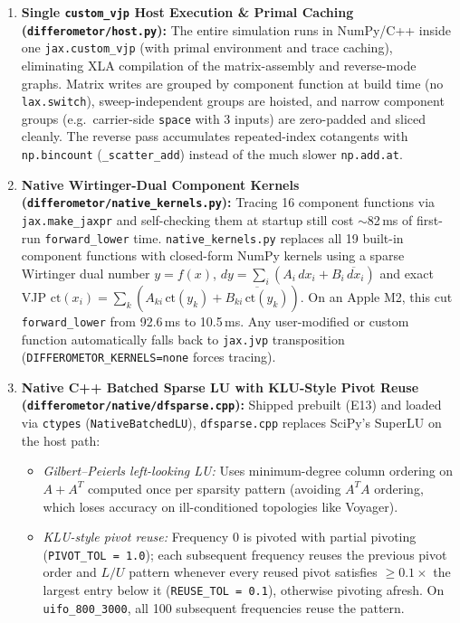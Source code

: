 \documentclass[11pt,a4paper]{article}
\begin{document}
\begin{enumerate}[leftmargin=1.6em,itemsep=3pt]
    \item \textbf{Single \texttt{custom\_vjp} Host Execution \& Primal Caching (\texttt{differometor/host.py}):} The entire simulation runs in NumPy/C++ inside one \texttt{jax.custom\_vjp} (with primal environment and trace caching), eliminating XLA compilation of the matrix-assembly and reverse-mode graphs. Matrix writes are grouped by component function at build time (no \texttt{lax.switch}), sweep-independent groups are hoisted, and narrow component groups (e.g.\ carrier-side \texttt{space} with 3 inputs) are zero-padded and sliced cleanly. The reverse pass accumulates repeated-index cotangents with \texttt{np.bincount} (\texttt{\_scatter\_add}) instead of the much slower \texttt{np.add.at}.
    \item \textbf{Native Wirtinger-Dual Component Kernels (\texttt{differometor/native\_kernels.py}):} Tracing 16 component functions via \texttt{jax.make\_jaxpr} and self-checking them at startup still cost $\sim$82\,ms of first-run \texttt{forward\_lower} time. \texttt{native\_kernels.py} replaces all 19 built-in component functions with closed-form NumPy kernels using a sparse Wirtinger dual number $y = f(x)$, $dy = \sum_i (A_i\,dx_i + B_i\,\overline{dx}_i)$ and exact VJP $\text{ct}(x_i) = \sum_k (A_{ki}\,\text{ct}(y_k) + \overline{B_{ki}\,\text{ct}(y_k)})$. On an Apple M2, this cut \texttt{forward\_lower} from 92.6\,ms to 10.5\,ms. Any user-modified or custom function automatically falls back to \texttt{jax.jvp} transposition (\texttt{DIFFEROMETOR\_KERNELS=none} forces tracing).
    \item \textbf{Native C++ Batched Sparse LU with KLU-Style Pivot Reuse (\texttt{differometor/native/dfsparse.cpp}):} Shipped prebuilt (E13) and loaded via \texttt{ctypes} (\texttt{NativeBatchedLU}), \texttt{dfsparse.cpp} replaces SciPy's SuperLU on the host path:
    \begin{itemize}[leftmargin=1.2em,itemsep=1pt]
        \item \emph{Gilbert--Peierls left-looking LU:} Uses minimum-degree column ordering on $A + A^T$ computed once per sparsity pattern (avoiding $A^T A$ ordering, which loses accuracy on ill-conditioned topologies like Voyager).
        \item \emph{KLU-style pivot reuse:} Frequency 0 is pivoted with partial pivoting (\texttt{PIVOT\_TOL = 1.0}); each subsequent frequency reuses the previous pivot order and $L/U$ pattern whenever every reused pivot satisfies $\ge 0.1\times$ the largest entry below it (\texttt{REUSE\_TOL = 0.1}), otherwise pivoting afresh. On \texttt{uifo\_800\_3000}, all 100 subsequent frequencies reuse the pattern.

\end{itemize}
\end{enumerate}
\end{document}

